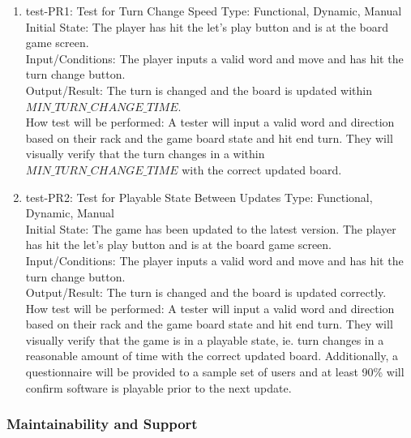 \documentclass[12pt, titlepage]{article}
\begin{document}
\begin{enumerate}
    \item{test-PR1: Test for Turn Change Speed} %
    Type: Functional, Dynamic, Manual\\
    Initial State: The player has hit the let's play button and is at the board game screen.\\
    Input/Conditions: The player inputs a valid word and move and has hit the turn change button.\\
    Output/Result:  The turn is changed and the board is updated within $MIN\_TURN\_CHANGE\_TIME$.\\
    How test will be performed: A tester will input a valid word and direction based on their rack and the game board state and hit end turn. They will visually verify that the turn changes in a within $MIN\_TURN\_CHANGE\_TIME$ with the correct updated board.\\
    
    \item{test-PR2: Test for Playable State Between Updates} %
    Type: Functional, Dynamic, Manual\\
    Initial State: The game has been updated to the latest version. The player has hit the let's play button and is at the board game screen.\\
    Input/Conditions: The player inputs a valid word and move and has hit the turn change button.\\
    Output/Result:  The turn is changed and the board is updated correctly.\\
    How test will be performed: A tester will input a valid word and direction based on their rack and the game board state and hit end turn. They will visually verify that the game is in a playable state, ie. turn changes in a reasonable amount of time with the correct updated board. Additionally, a questionnaire will be provided to a sample set of users and at least 90\% will confirm software is playable prior to the next update.\\
\end{enumerate}

\subsubsection{Maintainability and Support}
\end{document}
